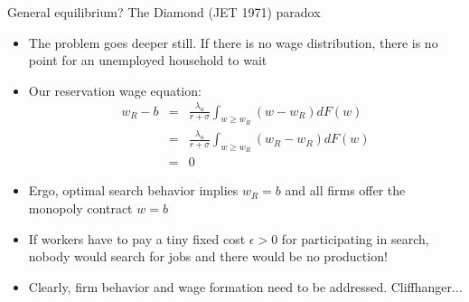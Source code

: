 \documentclass[9pt]{beamer}
\newcommand{\bit}{\begin{itemize}}
\newcommand{\eit}{\end{itemize}}
\begin{document}
\begin{frame}{General equilibrium? The Diamond (JET 1971) paradox}

\bit
\setlength\itemsep{1.5em}

\item The problem goes deeper still. If there is no wage distribution, there is no point for an unemployed household to wait

\item Our reservation wage equation:
\begin{eqnarray}
w_R  -b &=& \frac{\lambda_u }{r+\sigma} \int_{w\geq w_R} (w-w_R) dF(w) \nonumber \\
&=& \frac{\lambda_u }{r+\sigma} \int_{w\geq w_R} (w_R-w_R) dF(w) \nonumber \\
&=& 0 \nonumber
\end{eqnarray}

\item Ergo, optimal search behavior implies $w_R=b$ and all firms offer the monopoly contract $w=b$

\item If workers have to pay a tiny fixed cost $\epsilon>0$ for participating in search, nobody would search for jobs and there would be no production!

\item Clearly, firm behavior and wage formation need to be addressed. Cliffhanger...
\eit
\end{frame}
\end{document}
